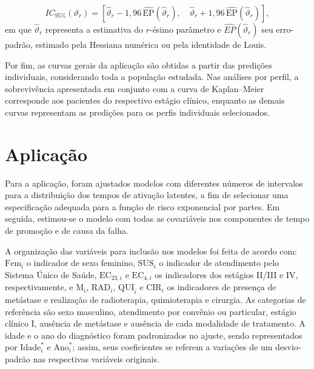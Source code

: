 \documentclass[11pt,a4paper]{article}
\begin{document}
\begin{equation}
IC_{95\%}(\vartheta_r)=
\left[
\widehat{\vartheta}_r-1{,}96\,\widehat{\mathrm{EP}}(\widehat{\vartheta}_r),
\quad
\widehat{\vartheta}_r+1{,}96\,\widehat{\mathrm{EP}}(\widehat{\vartheta}_r)
\right],
\end{equation}
\noindent em que \(\widehat{\vartheta}_r\) representa a estimativa do \(r\)-ésimo parâmetro e \(\widehat{EP}(\widehat{\vartheta}_r)\) seu erro-padrão, estimado pela Hessiana numérica ou pela identidade de Louis.

Por fim, as curvas gerais da aplicação são obtidas a partir das predições individuais, considerando toda a população estudada. Nas análises por perfil, a sobrevivência apresentada em conjunto com a curva de Kaplan–Meier corresponde aos pacientes do respectivo estágio clínico, enquanto as demais curvas representam as predições para os perfis individuais selecionados.

 \section{Aplicação}

Para a aplicação, foram ajustados modelos com diferentes números de intervalos para a distribuição dos tempos de ativação latentes, a fim de selecionar uma especificação adequada para a função de risco exponencial por partes. Em seguida, estimou-se o modelo com todas as covariáveis nos componentes de tempo de promoção e de causa da falha. 

A organização das variáveis para inclusão nos modelos foi feita de acordo com: $\mathrm{Fem}_i$ o indicador de sexo feminino, $\mathrm{SUS}_i$ o indicador de atendimento pelo Sistema Único de Saúde, $\mathrm{EC}_{23,i}$ e $\mathrm{EC}_{4,i}$ os indicadores dos estágios II/III e IV, respectivamente, e $\mathrm{M}_i$, $\mathrm{RAD}_i$, $\mathrm{QUI}_i$ e $\mathrm{CIR}_i$ os indicadores de presença de metástase e realização de radioterapia, quimioterapia e cirurgia. As categorias de referência são sexo masculino, atendimento por convênio ou particular, estágio clínico I, ausência de metástase e ausência de cada modalidade de tratamento. A idade e o ano do diagnóstico foram padronizados no ajuste, sendo representados por $\mathrm{Idade}_i^*$ e $\mathrm{Ano}_i^*$; assim, seus coeficientes se referem a variações de um desvio-padrão nas respectivas variáveis originais.
\end{document}
